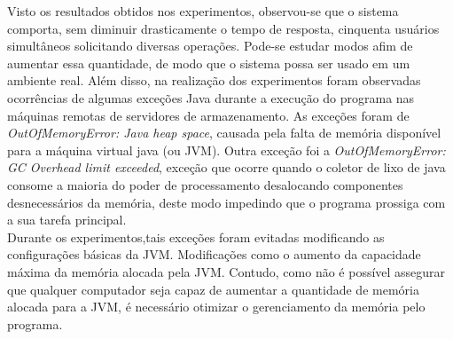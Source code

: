 Visto os resultados obtidos nos experimentos, observou-se que o sistema comporta, sem diminuir drasticamente o tempo de resposta, cinquenta usuários simultâneos solicitando diversas operações. Pode-se estudar modos afim de aumentar essa quantidade, de modo que o sistema possa ser usado em um ambiente real. Além disso, na realização dos experimentos foram observadas ocorrências de algumas exceções Java durante a execução do programa nas máquinas remotas de servidores de armazenamento. As exceções foram de \textit{OutOfMemoryError: Java heap space}, causada pela falta de memória disponível para a máquina virtual java (ou JVM). Outra exceção foi a \textit{OutOfMemoryError: GC Overhead limit exceeded}, exceção que ocorre quando o coletor de lixo de java consome a maioria do poder de processamento desalocando componentes desnecessários da memória, deste modo impedindo que o programa prossiga com a sua tarefa principal.
\\

Durante os experimentos,tais exceções foram evitadas modificando as configurações básicas da JVM. Modificações como o aumento da capacidade máxima da memória alocada pela JVM. Contudo, como não é possível assegurar que qualquer computador seja capaz de aumentar a quantidade de memória alocada para a JVM, é necessário otimizar o gerenciamento da memória pelo programa.
\\


